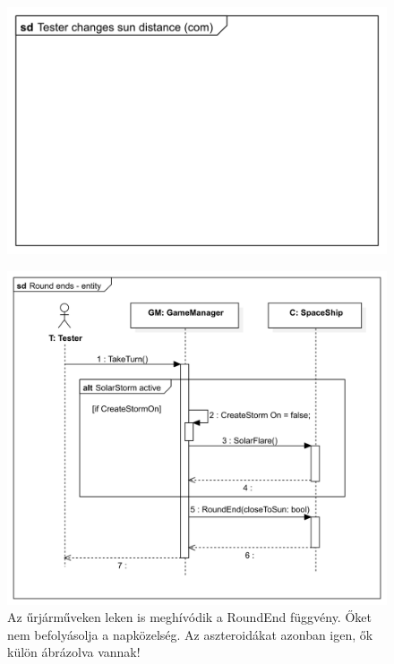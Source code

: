\begin{figure}[H] 
\centering 
\includegraphics[width=1\textwidth]{docs/img/svg/Skeleton!Move asteroid field!Change Sun Distance!Communication!Tester changes sun distance (com)_37.png} 
\end{figure} 

\begin{figure}[H] 
\centering 
\includegraphics[width=1\textwidth]{docs/img/svg/Skeleton!Move asteroid field!Collaboration2!Sequence!Round ends - entity_39.png} 
\caption{Az űrjárműveken leken is meghívódik a RoundEnd függvény. Őket nem befolyásolja a napközelség.
Az aszteroidákat azonban igen, ők külön ábrázolva vannak!} 
\end{figure} 

